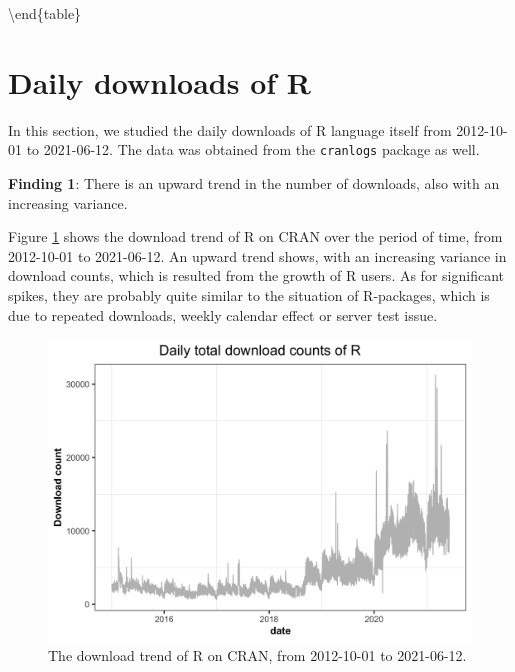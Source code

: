 \documentclass[
]{book}
\newenvironment{discovery}[1]{%
  \begin{tcolorbox}[colback=blue!30,colframe=blue!80!black]#1}{\end{tcolorbox}}
\begin{document}
\textbackslash end\{table\}

\hypertarget{daily-downloads-of-r}{%
\section{Daily downloads of R}\label{daily-downloads-of-r}}

In this section, we studied the daily downloads of R language itself from 2012-10-01 to 2021-06-12. The data was obtained from the \texttt{cranlogs} package \autocite{cranlogs} as well.

\begin{discovery}
\textbf{Finding 1}: There is an upward trend in the number of downloads,
also with an increasing variance.
\end{discovery}

Figure \ref{fig:R-download-trend} shows the download trend of R on CRAN over the period of time, from 2012-10-01 to 2021-06-12. An upward trend shows, with an increasing variance in download counts, which is resulted from the growth of R users. As for significant spikes, they are probably quite similar to the situation of R-packages, which is due to repeated downloads, weekly calendar effect or server test issue.



\begin{figure}

{\centering \includegraphics{figures/R-download-trend-1} 

}

\caption{The download trend of R on CRAN, from 2012-10-01 to 2021-06-12.}\label{fig:R-download-trend}
\end{figure}
\end{document}
